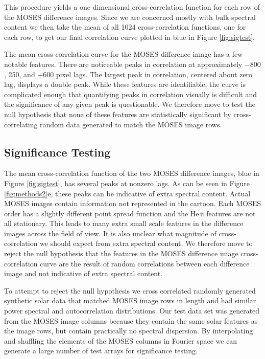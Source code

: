 \documentclass[]{solarphysics}
\begin{document}
\begin{article}
	 This procedure yields a one dimensional cross-correlation function for each row of the MOSES difference images.  Since we are concerned mostly with bulk spectral content we then take the mean of all 1024 cross-correlation functions, one for each row, to get our final correlation curve plotted in blue in Figure \ref{fig:sigtest}. 
	 
	 The mean cross-correlation curve for the MOSES difference image has a few notable features.  There are noticeable peaks in correlation  at approximately $-800$, 250, and $+600$ pixel lags.  The largest peak in correlation, centered about zero lag, displays a double peak.   While these features are identifiable, the curve is complicated enough that quantifying peaks in correlation visually is difficult and the significance of any given peak is questionable. We therefore move to test the null hypothesis that none of these features are statistically significant by cross-correlating random data generated to match the MOSES image rows.
 
	
	\subsection{Significance Testing}
	\label{sec:sigtesting}
	The mean cross-correlation function of the two MOSES difference images, blue in Figure \ref{fig:sigtest}, has several peaks at nonzero lags.  As can be seen in Figure \ref{fig:methods2}e, these peaks can be indicative of extra spectral content.  Actual MOSES images contain information not represented in the cartoon.  Each MOSES order has a slightly different point spread function and the He\,{\sc ii} features are not all stationary.  This leads to many extra small scale features in the difference images across the field of view.  It is also unclear what magnitude of cross-correlation we should expect from extra spectral content.  We therefore move to reject the null hypothesis that the features in the MOSES difference image cross-correlation curve are the result of random correlations between each difference image and not indicative of extra spectral content.  
	
	To attempt to reject the null hypothesis we cross correlated randomly generated synthetic solar data that matched MOSES image rows in length and had similar power spectral and autocorrelation distributions.  Our test data set was generated from the MOSES image columns because they contain the same solar features as the image rows, but contain practically no spectral dispersion.  By interpolating and shuffling the elements of the MOSES columns in Fourier space we can generate a large number of test arrays for significance testing.
	

\end{article}
\end{document}
